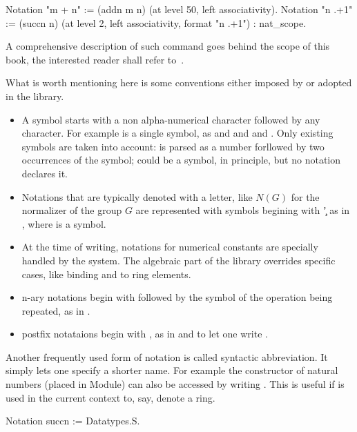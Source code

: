 \begin{coq}{}{}
Notation "m + n" := (addn m n) (at level 50, left associativity). 
Notation "n .+1" := (succn n) (at level 2, left associativity,
  format "n .+1") : nat_scope.
\end{coq}
A comprehensive description of such command goes behind
the scope of this book, the interested reader shall refer to~\cite[section 12]{Coq:manual}.

What is worth mentioning here is some conventions either imposed by \Coq{}
or adopted in the \mcbMC{} library.

\begin{itemize}
\item A symbol starts with a non alpha-numerical character followed by
	any character.  For example  is a single symbol, as
	 and \C{\%/} and \C{<=} and \C{[::}.  Only existing
	symbols are taken into account:  is parsed as a number
	forllowed by two occurrences of the  symbol;  could
	be a symbol, in principle, but no notation declares it.
\item Notations that are typically denoted with a letter, like $N(G)$ for the
	normalizer of the group $G$ are represented with symbols begining
	with \c{'} as in , where  is a symbol.
\item At the time of writing, notations for numerical constants are specially
	handled by the system.  The algebraic part of the library overrides
	specific cases, like binding  and  to ring elements.
\item n-ary notations begin with \C{[} followed by the symbol of the
	operation being repeated, as in .
\item postfix notataions begin with , as in  and 
	to let one write .
\end{itemize}

Another frequently used form of notation is called syntactic abbreviation.
It simply lets one specify a shorter name.  For example the  constructor
of natural numbers (placed in  Module) can also be accessed
by writing .  This is useful if  is used in the current context
to, say, denote a ring.

\begin{coq}{}{}
Notation succn := Datatypes.S.
\end{coq}

